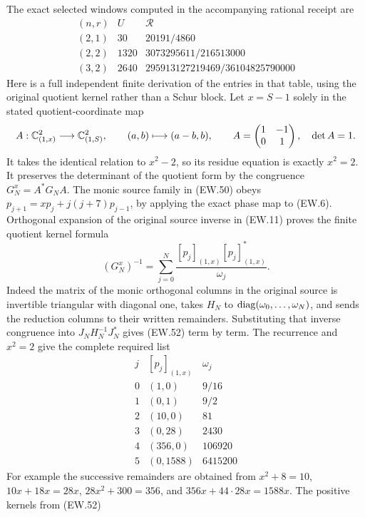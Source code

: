The exact selected windows computed in the accompanying rational
receipt are
\[
\begin{array}{c|c|c}
 (n,r)&U&\mathscr R\\\hline
 (2,1)&30&20191/4860\\
 (2,2)&1320&3073295611/216513000\\
 (3,2)&2640&295913127219469/36104825790000
\end{array}                                                   \tag{EW.51}
\]
Here is a full independent finite derivation of the entries in that
table, using the original quotient kernel rather than a Schur block.
Let $x=S-1$ solely in the stated quotient-coordinate map
\[
 A:\mathbb{C}^2_{(1,x)}\longrightarrow\mathbb{C}^2_{(1,S)},\qquad
 (a,b)\longmapsto(a-b,b),\qquad
 A=\begin{pmatrix}1&-1\\0&1\end{pmatrix},\quad\det A=1.
\]
It takes the identical relation to $x^2-2$, so its residue equation
is exactly $x^2=2$. It preserves the determinant of the quotient
form by the congruence $G_N^x=A^*G_NA$. The monic source family
in (EW.50) obeys
$p_{j+1}=xp_j+j(j+7)p_{j-1}$, by applying the exact phase map to
(EW.6). Orthogonal expansion of the original source inverse in
(EW.11) proves the finite quotient kernel formula
\[
 (G_N^x)^{-1}=\sum_{j=0}^N
     \frac{[p_j]_{(1,x)}[p_j]_{(1,x)}^*}{\omega_j}.
                                                               \tag{EW.52}
\]
Indeed the matrix of the monic orthogonal columns in the original
source is invertible triangular with diagonal one, takes $H_N$
to $\operatorname{diag}(\omega_0,\ldots,\omega_N)$, and sends the reduction
columns to their written remainders. Substituting that inverse
congruence into $J_NH_N^{-1}J_N^*$ gives (EW.52) term by term.
The recurrence and $x^2=2$ give the complete required list
\[
\begin{array}{c|c|c}
 j &[p_j]_{(1,x)}&\omega_j\\\hline
 0&(1,0)&9/16\\
 1&(0,1)&9/2\\
 2&(10,0)&81\\
 3&(0,28)&2430\\
 4&(356,0)&106920\\
 5&(0,1588)&6415200
\end{array}                                                   \tag{EW.53}
\]
For example the successive remainders are obtained from
$x^2+8=10$, $10x+18x=28x$, $28x^2+300=356$, and
$356x+44\cdot28x=1588x$. The positive kernels from (EW.52)
